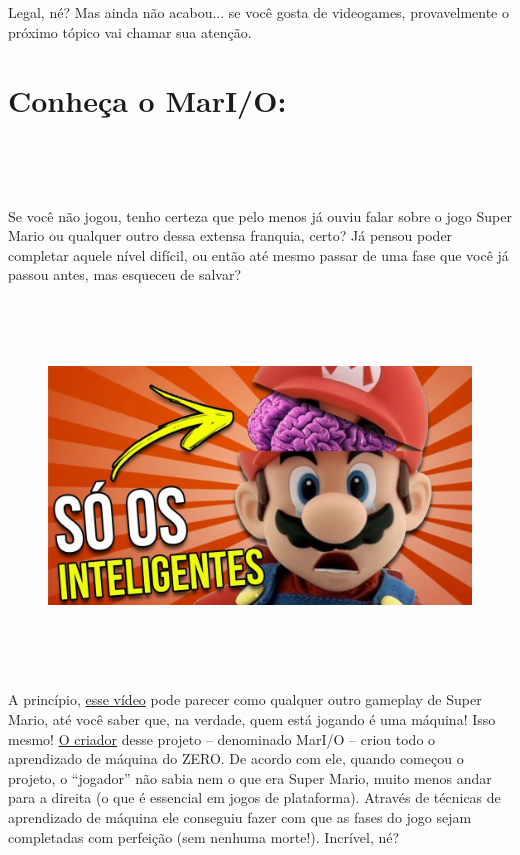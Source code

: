 \documentclass[12pt]{article}
\begin{document}
Legal, né? Mas ainda não acabou... se você gosta de
videogames, provavelmente o próximo tópico vai chamar sua atenção.
           \section*{\centering \textbf{Conheça o MarI/O:}}\label{sec:MarI/O}
\

\

Se você não jogou, tenho certeza que pelo menos já ouviu falar sobre o
jogo Super Mario ou qualquer outro dessa extensa franquia, certo?
Já pensou poder completar aquele nível difícil, ou então até mesmo
passar de uma fase que você já passou antes, mas esqueceu de
salvar?

\

\


            \begin{figure}[ht]
            \label{fig:classificação}
            \centering
            \includegraphics[scale=0.3]{ldo-2.jpg}               
            \end{figure}
            
\

\


A princípio, \href{https://www.youtube.com/watch?v=qv6UVOQ0F44}{esse vídeo} pode parecer como qualquer outro gameplay de Super Mario, até você saber que, na verdade, quem está jogando é uma
máquina! Isso mesmo! \href{https://www.youtube.com/channel/UC8aG3LDTDwNR1UQhSn9uVrw}{O criador} desse projeto – denominado MarI/O –
criou todo o aprendizado de máquina do ZERO. De acordo com ele,
quando começou o projeto, o “jogador” não sabia nem o que era Super
Mario, muito menos andar para a direita (o que é essencial em jogos de
plataforma). Através de técnicas de aprendizado de máquina ele
conseguiu fazer com que as fases do jogo sejam completadas com
perfeição (sem nenhuma morte!). Incrível, né?
           
\end{document}
